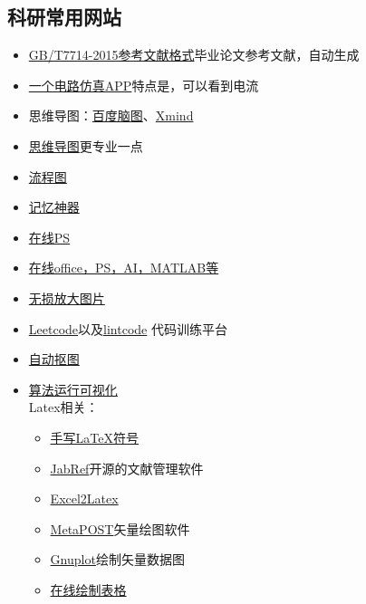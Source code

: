 \documentclass[UTF8,oneside]{ctexbook}
\begin{document}
\subsection{科研常用网站}
\begin{itemize}
	\item \href{http://www.latexstudio.net/archives/6888.html}{GB/T7714-2015参考文献格式}\quad 毕业论文参考文献，自动生成
	\item \href{https://www.52pojie.cn/thread-716675-1-1.html}{一个电路仿真APP}\quad 特点是，可以看到电流
	\item 思维导图：\href{http://naotu.baidu.com/file/97d9cd5ca30672903a3e3321e62c6ed8}{百度脑图}、\href{https://www.xmind.net/}{Xmind}
	\item \href{https://mm.edrawsoft.cn/map.html?obj=wxoa3v5wBLcpmgCifx59_Uzk5X4qHU/Personal/未命名文件.emmx}{思维导图}更专业一点
	\item \href{https://www.processon.com/login;jsessionid=022BCDCA031DD3C240BE7FD87D942F03.jvm1?backUrl=/diagraming/5be7a513e4b0d74dc539976e}{流程图}
	\item \href{https://ankiweb.net/shared/decks/}{记忆神器}
	\item \href{https://www.photopea.com}{在线PS}
	\item \href{https://uzer.me/u/signin}{在线office，PS，AI，MATLAB等}
	\item \href{https://bigjpg.com}{无损放大图片}
	\item \href{https://leetcode.com}{Leetcode}以及\href{https://www.lintcode.com/zh-cn/accounts/signup/}{lintcode} 代码训练平台
	\item \href{https://www.remove.bg}{自动抠图}
	\item \href{https://algorithm-visualizer.org}{算法运行可视化}\\
	      Latex相关：
	      \begin{itemize}
		      \item \href{http://detexify.kirelabs.org/classify.html}{手写LaTeX符号}
		      \item \href{http://www.jabref.org}{JabRef}\quad 开源的文献管理软件
		      \item \href{http://www.latexstudio.net/archives/6992.html}{Excel2Latex}
		      \item \href{http://www.ursoswald.ch/metapost/introduction.html}{MetaPOST}\quad 矢量绘图软件
		      \item \href{http://www.gnuplot.info}{Gnuplot}\quad 绘制矢量数据图
		      \item \href{https://www.tablesgenerator.com/#}{在线绘制表格}

\end{itemize}
\end{itemize}
\end{document}
